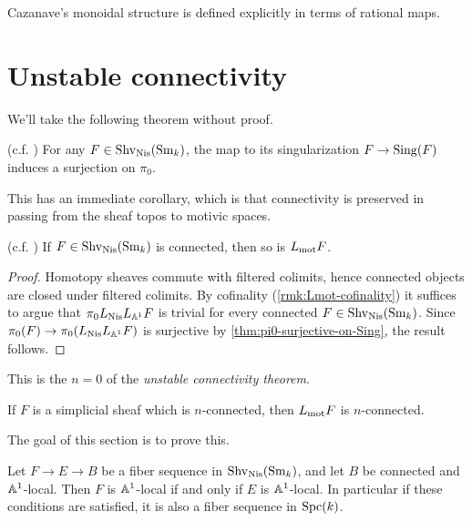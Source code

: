 \documentclass[11pt,openany]{book}
\begin{document}
Cazanave's monoidal structure is defined explicitly in terms of rational maps.


\section{Unstable connectivity}

We'll take the following theorem without proof.

\begin{theorem}\label{thm:pi0-surjective-on-Sing} 
\cite[\S.3.22~(p.94)]{MV} (c.f. \cite[2.7]{AD-excision})
For any $F\in \mathrm{Shv}_{\mathrm{Nis}}(\mathrm{Sm}_k)$, the map to its singularization $F \to \mathrm{Sing}(F)$ induces a surjection on $\pi_0$.
\end{theorem}

This has an immediate corollary, which is that connectivity is preserved in passing from the sheaf topos to motivic spaces.

\begin{corollary}\label{cor:unstable-connectivity-0} 
(c.f. \cite[1.2]{bachmannstrongly}) If $F\in \mathrm{Shv}_{\mathrm{Nis}}(\mathrm{Sm}_k)$ is connected, then so is $L_{\mathrm{mot}} F$.
\end{corollary}
\begin{proof} Homotopy sheaves commute with filtered colimits, hence connected objects are closed under filtered colimits. By cofinality (\autoref{rmk:Lmot-cofinality}) it suffices to argue that $\pi_0 L_{\mathrm{Nis}} L_{\mathbb{A}^1}F$ is trivial for every connected $F \in \mathrm{Shv}_{\mathrm{Nis}}(\mathrm{Sm}_k)$. Since $\pi_0(F) \to \pi_0(L_{\mathrm{Nis}} L_{\mathbb{A}^1} F)$ is surjective by \autoref{thm:pi0-surjective-on-Sing}, the result follows.
\end{proof}

This is the $n=0$ of the \textit{unstable connectivity theorem}.


\begin{theorem} 
\label{thm:unstable-connectivity}
If $F$ is a simplicial sheaf which is $n$-connected, then $L_{\mathrm{mot}} F$ is $n$-connected.
\end{theorem}

The goal of this section is to prove this.

\begin{lemma}\label{lem:fiber-seq-a1-local} \cite[1.9]{bachmannstrongly}
Let $F \to E \to B$ be a fiber sequence in $\mathrm{Shv}_{\mathrm{Nis}}(\mathrm{Sm}_k)$, and let $B$ be connected and $\mathbb{A}^1$-local. Then $F$ is $\mathbb{A}^1$-local if and only if $E$ is $\mathbb{A}^1$-local. In particular if these conditions are satisfied, it is also a fiber sequence in $\mathrm{Spc}(k)$.
\end{lemma}
\end{document}
